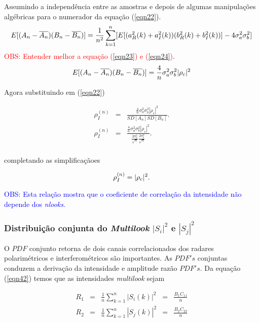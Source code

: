 Assumindo a independência entre as amostras e depois de algumas manipulações algébricas para o numerador da equação (\ref{eqn22}). 
\begin{equation}\label{eqn23}
	E[(A_n-\overline{A_n})(B_n-\overline{B_n})]=\frac{1}{n^2}\sum_{k=1}^{n}[E[(a_{R}^2(k)+a_{I}^2(k))(b_{R}^2(k)+b_{I}^2(k))]-4\sigma_a^2\sigma_b^2] \\
\end{equation}
\textcolor{red}{OBS: Entender melhor a equação (\ref{eqn23}) e (\ref{eqn24})}.
\begin{equation}\label{eqn24}
	E[(A_n-\overline{A_n})(B_n-\overline{B_n})]=\frac{4}{n}\sigma_a^2\sigma_b^2|\rho_c|^2\\
\end{equation}

Agora substituindo em (\ref{eqn22})

\begin{equation}\label{eqn25}
\begin{array}{ccc}
	\rho_I^{(n)}&=&\frac{\frac{4}{n}\sigma_a^2\sigma_b^2|\rho_c|^2}{SD[A_n]SD[B_n]}. \\
	\rho_I^{(n)}&=&\frac{\frac{4}{n}\sigma_a^2\sigma_b^2|\rho_c|^2}{\frac{2\sigma_a^2}{\sqrt{n}}\frac{2\sigma_b^2}{\sqrt{n}}}. \\
\end{array}
\end{equation}

completando as simplificaçãoes

\begin{equation}\label{eqn26}
	\rho_I^{(n)}=|\rho_c|^2. \\
\end{equation}

\textcolor{blue}{OBS: Esta relação mostra que o coeficiente de correlação da intensidade não depende dos {\it nlooks}.}



\subsubsection{Distribuição conjunta do {\it Multilook} $|S_i|^2$ e $|S_j|^2$ }

O $PDF$ conjunto retorna de dois canais correlacionados dos radares polarimétricos e interferométricos são importantes. As $PDF's$ conjuntas conduzem a derivação da intensidade e amplitude razão $PDF's$. Da equação (\ref{eqn42}) temos que as intensidades {\it multilook} sejam 

\begin{equation}\label{eqn59}
\begin{array}{ccccc}
	R_1&=&\frac{1}{n}\sum_{k=1}^{n}|S_i(k)|^2&=&\frac{B_1C_{11}}{n}\\
	R_2&=&\frac{1}{n}\sum_{k=1}^{n}|S_j(k)|^2&=&\frac{B_2C_{22}}{n}\\
\end{array}
\end{equation}

